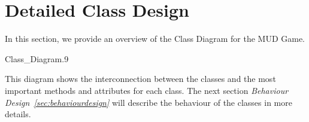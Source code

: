 \section{Detailed Class Design}
\label{sec:detailedclassdesign}
In this section, we provide an overview of the Class Diagram for the MUD Game. 

\begin{myfigure}{Class_Diagram}{.9}%
	\caption{Class Diagram of the MUD game}
	\label{fig:class-design}
\end{myfigure}

This diagram shows the interconnection between the classes and the most important methods and attributes for each class. The next section \emph{Behaviour Design~\ref{sec:behaviourdesign}} will describe the behaviour of the classes in more details.